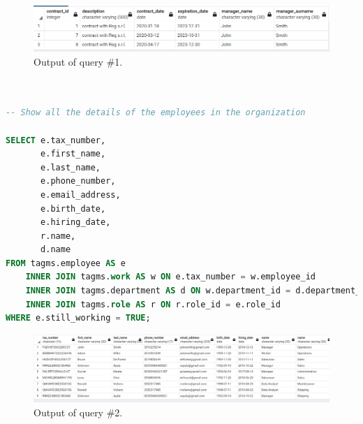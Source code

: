 \begin{figure}[h!]
	\centering
	\includegraphics[width=\linewidth]{images/q1}
	\caption{Output of query \#1.}
	\label{fig:q1}
\end{figure}



\begin{lstlisting}[language=SQL,
	keywordstyle=\color{blue},
	stringstyle=\color{mauve},
	showstringspaces=false,
	breaklines=true,
	basicstyle=\ttfamily\footnotesize]


-- Show all the details of the employees in the organization

SELECT e.tax_number,
       e.first_name,
       e.last_name,
       e.phone_number,
       e.email_address,
       e.birth_date,
       e.hiring_date,
       r.name,
       d.name
FROM tagms.employee AS e
    INNER JOIN tagms.work AS w ON e.tax_number = w.employee_id
    INNER JOIN tagms.department AS d ON w.department_id = d.department_id
    INNER JOIN tagms.role AS r ON r.role_id = e.role_id
WHERE e.still_working = TRUE;

\end{lstlisting}

\begin{figure}[h!]
	\centering
	\includegraphics[width=\linewidth]{images/q2}
	\caption{Output of query \#2.}
	\label{fig:q2}
\end{figure}

\newpage

